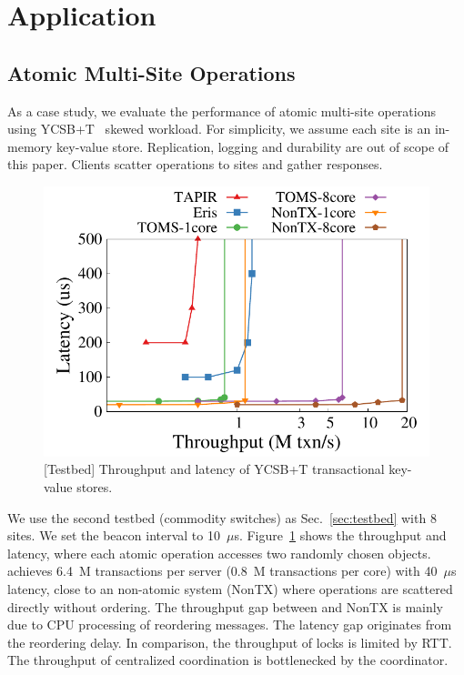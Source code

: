\section{Application}
\label{sec:application}

\subsection{Atomic Multi-Site Operations}
\label{subsec:eval-kvs}

As a case study, we evaluate the performance of atomic multi-site operations using YCSB+T~\cite{dey2014ycsbt} skewed workload. For simplicity, we assume each site is an in-memory key-value store. Replication, logging and durability are out of scope of this paper. Clients scatter operations to sites and gather responses.





\begin{figure}[t]
\centering
\includegraphics[width=.45\textwidth]{gnuplot/ycsb.pdf}
\caption{[Testbed] Throughput and latency of YCSB+T transactional key-value stores.}
\label{fig:ycsb}
\end{figure}


We use the second testbed (commodity switches) as Sec.~\ref{sec:testbed} with 8 sites. We set the beacon interval to 10~$\mu$s.
Figure~\ref{fig:ycsb} shows the throughput and latency, where each atomic operation accesses two randomly chosen objects.
\sys achieves 6.4~M transactions per server (0.8~M transactions per core) with 40~$\mu$s latency, close to an non-atomic system (NonTX) where operations are scattered directly without ordering.
The throughput gap between \sys and NonTX is mainly due to CPU processing of reordering messages.
The latency gap originates from the reordering delay.
In comparison, the throughput of locks is limited by RTT.
The throughput of centralized coordination is bottlenecked by the coordinator.

